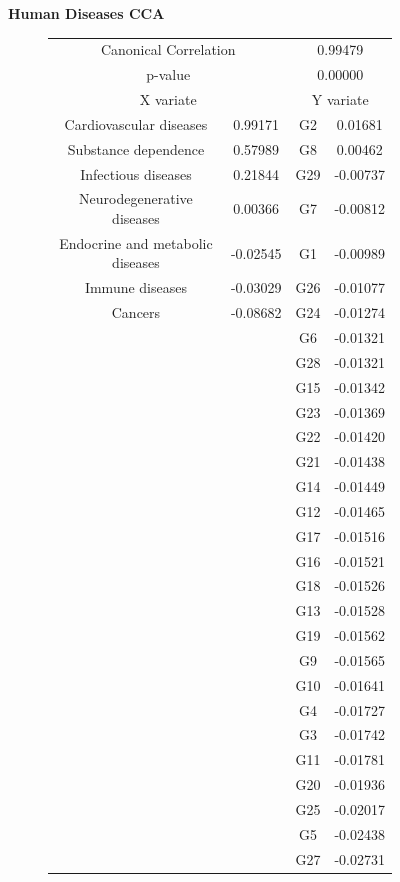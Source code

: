 \begin{figure}
  \centering
  \textbf{Human Diseases CCA}\par\medskip
  \begin{subfigure}{.65\textwidth}
  \centering
  \begin{tabular}{ c c | c c }
    \multicolumn{2}{c}{Canonical Correlation} &  \multicolumn{2}{c}{0.99479} \\
    \multicolumn{2}{c}{p-value} &  \multicolumn{2}{c}{0.00000} \\
    \hline
    \multicolumn{2}{c}{X variate} & \multicolumn{2}{c}{Y variate}\\
    \hline
  Cardiovascular diseases & 0.99171 &  G2 & 0.01681\\
  Substance dependence & 0.57989 &  G8 & 0.00462\\
  Infectious diseases & 0.21844 &  G29 & -0.00737\\
  Neurodegenerative diseases & 0.00366 &  G7 & -0.00812\\
  Endocrine and metabolic diseases & -0.02545 &  G1 & -0.00989\\
  Immune diseases & -0.03029 &  G26 & -0.01077\\
  Cancers & -0.08682 &  G24 & -0.01274\\
  & &  G6 & -0.01321\\
  & &  G28 & -0.01321\\
  & &  G15 & -0.01342\\
  & &  G23 & -0.01369\\
  & &  G22 & -0.01420\\
  & &  G21 & -0.01438\\
  & &  G14 & -0.01449\\
  & &  G12 & -0.01465\\
  & &  G17 & -0.01516\\
  & &  G16 & -0.01521\\
  & &  G18 & -0.01526\\
  & &  G13 & -0.01528\\
  & &  G19 & -0.01562\\
  & &  G9 & -0.01565\\
  & &  G10 & -0.01641\\
  & &  G4 & -0.01727\\
  & &  G3 & -0.01742\\
  & &  G11 & -0.01781\\
  & &  G20 & -0.01936\\
  & &  G25 & -0.02017\\
  & &  G5 & -0.02438\\
  & &  G27 & -0.02731\\
  \end{tabular}



\end{subfigure}
\end{figure}
